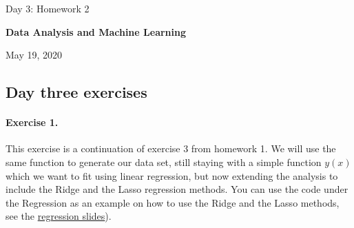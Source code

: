 \documentclass[%
oneside,                 %
final,                   %
10pt]{article}
\begin{document}

\newcommand{\exercisesection}[1]{\subsection*{#1}}






\thispagestyle{empty}

\begin{center}
{\LARGE\bf
\begin{spacing}{1.25}
Day 3: Homework 2
\end{spacing}
}
\end{center}


\begin{center}
{\bf Data Analysis and Machine Learning${}^{}$} \\ [0mm]
\end{center}

\begin{center}
\end{center}
    

\begin{center}
May 19, 2020
\end{center}

\vspace{1cm}


\subsection*{Day three exercises}


\paragraph{Exercise 1.}
This exercise is a continuation of exercise 3 from homework 1. We will
use the same function to generate our data set, still staying with a
simple function $y(x)$ which we want to fit using linear regression,
but now extending the analysis to include the Ridge and the Lasso
regression methods. You can use the code under the Regression as an example on how to use the Ridge and the Lasso methods, see the \href{{https://compphysics.github.io/MachineLearning/doc/pub/Regression/html/Regression-bs.html}}{regression slides}). 
\end{document}
